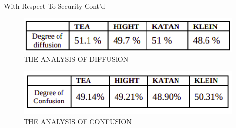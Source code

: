 \begin{frame}{With Respect To Security Cont'd}
	\begin{itemize}
    \begin{figure}
    \centering
    \includegraphics[width= 75 mm]{Pics/DF.png} 
    \caption{THE ANALYSIS OF DIFFUSION}
    \label{fig:6distinguisher}
\end{figure} 
    \begin{figure}
    \centering
    \includegraphics[width= 75 mm]{Pics/DC.png} 
    \caption{THE ANALYSIS OF CONFUSION}
    \label{fig:6distinguisher}
\end{figure} 
	\end{itemize}
\end{frame}





